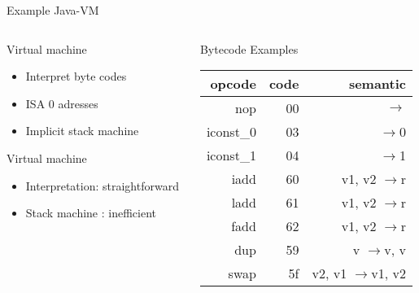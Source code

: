 %
\begin{Frame}{Example Java-VM}
  \begin{columns}[t]
    \begin{column}{5cm} %
      \begin{block}{Virtual machine}
        \begin{itemize}
        \item Interpret byte codes
        \item ISA 0 adresses
        \item Implicit stack machine
        \end{itemize}
      \end{block} 
      \begin{block}{Virtual machine}
        \begin{itemize}
        \item Interpretation: straightforward
        \item Stack machine : inefficient
        \end{itemize}
      \end{block} 
    \end{column}
\newcommand{\RA}{$\rightarrow$}
    \begin{column}{5cm} %
      \begin{block}{Bytecode Examples}
\footnotesize       \begin{tabular}{|r r r|}\hline{}
opcode       & code & semantic \\ \hline
nop 	     & 00 &	\RA\\
iconst\_0    & 03 &	\RA 0 \\
iconst\_1    & 04 &	\RA 1 \\
iadd 	     & 60 &	v1, v2 \RA r\\ 
ladd 	     & 61 &	v1, v2 \RA r \\
fadd 	     & 62 &	v1, v2 \RA r \\
dup  	     & 59 &	v \RA v, v \\
swap 	     & 5f & v2, v1 \RA v1, v2\\
\hline
        \end{tabular}
      \end{block}   
    \end{column}
  \end{columns}  
\end{Frame}


